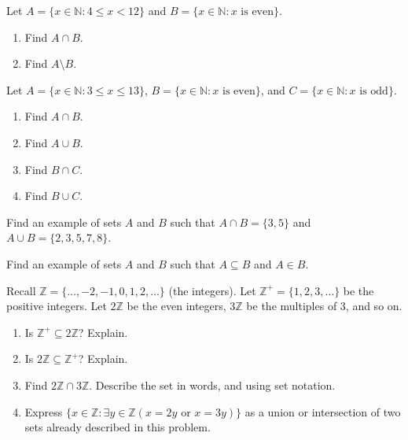 \documentclass[11pt,]{book}
\theoremstyle{ptxplainnotitle}
\theoremstyle{ptxplaintitle}
\theoremstyle{ptxdefinitionnotitle}
\theoremstyle{ptxdefinitiontitle}
\theoremstyle{ptxdefinitionnotitle}
\theoremstyle{ptxdefinitiontitle}
\theoremstyle{ptxdefinitionnotitle}
\theoremstyle{ptxdefinitiontitle}
\theoremstyle{ptxdefinitiontitlenonumber}
\theoremstyle{ptxdefinitiontitlenonumber}
\numberwithin{equation}{chapter}
\newcommand{\N}{\mathbb N}
\newcommand{\Z}{\mathbb Z}
\newcommand{\st}{:}
\newcommand{\lt}{<}
\begin{document}
\begin{divisionexercise}{9}\hypertarget{exercise-86}{}
\hypertarget{p-880}{}%
Let \(A = \{x \in \N \st 4 \le x \lt 12\}\) and \(B = \{x \in \N \st x \text{ is even}\}\text{.}\) \leavevmode%
\begin{enumerate}[label=\alph*.]
\item\hypertarget{li-394}{}\hypertarget{p-881}{}%
Find \(A \cap B\text{.}\)%
\item\hypertarget{li-395}{}\hypertarget{p-883}{}%
Find \(A \setminus B\text{.}\)%
\end{enumerate}
%
\end{divisionexercise}%
\begin{divisionexercise}{10}\hypertarget{exercise-87}{}
\hypertarget{p-889}{}%
Let \(A = \{x \in \N \st 3 \le x \le 13\}\), \(B = \{x \in \N \st x \mbox{ is even} \}\), and \(C = \{x \in \N \st x \mbox{ is odd} \}\). \leavevmode%
\begin{enumerate}[label=(\alph*)]
\item\hypertarget{li-398}{}\hypertarget{p-890}{}%
Find \(A \cap B\).%
\item\hypertarget{li-399}{}\hypertarget{p-891}{}%
Find \(A \cup B\).%
\item\hypertarget{li-400}{}\hypertarget{p-892}{}%
Find \(B \cap C\).%
\item\hypertarget{li-401}{}\hypertarget{p-893}{}%
Find \(B \cup C\).%
\end{enumerate}
%
\end{divisionexercise}%
\begin{divisionexercise}{11}\hypertarget{exercise-88}{}
\hypertarget{p-894}{}%
Find an example of sets \(A\) and \(B\) such that \(A\cap B = \{3, 5\}\) and \(A \cup B = \{2, 3, 5, 7, 8\}\).%
\end{divisionexercise}%
\begin{divisionexercise}{12}\hypertarget{exercise-89}{}
\hypertarget{p-895}{}%
Find an example of sets \(A\) and \(B\) such that \(A \subseteq B\) and \(A \in B\).%
\end{divisionexercise}%
\begin{divisionexercise}{13}\hypertarget{exercise-90}{}
\hypertarget{p-897}{}%
Recall \(\Z = \{\ldots,-2,-1,0, 1,2,\ldots\}\) (the integers). Let \(\Z^+ = \{1, 2, 3, \ldots\}\) be the positive integers. Let \(2\Z\) be the even integers, \(3\Z\) be the multiples of 3, and so on. \leavevmode%
\begin{enumerate}[label=(\alph*)]
\item\hypertarget{li-402}{}\hypertarget{p-898}{}%
Is \(\Z^+ \subseteq 2\Z\)? Explain.%
\item\hypertarget{li-403}{}\hypertarget{p-899}{}%
Is \(2\Z \subseteq \Z^+\)? Explain.%
\item\hypertarget{li-404}{}\hypertarget{p-900}{}%
Find \(2\Z \cap 3\Z\). Describe the set in words, and using set notation.%
\item\hypertarget{li-405}{}\hypertarget{p-901}{}%
Express \(\{x \in \Z \st \exists y\in \Z (x = 2y \text{ or } x = 3y)\}\) as a union or intersection of two sets already described in this problem.%
\end{enumerate}
%
\end{divisionexercise}%
\end{document}
